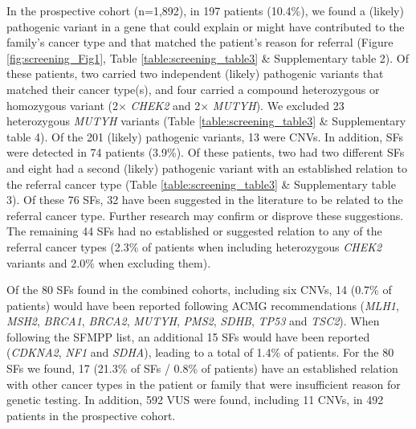 In the prospective cohort (n=1,892), in 197 patients (10.4\%), we found a (likely) pathogenic variant in a gene that could explain or might have contributed to the family’s cancer type and that matched the patient’s reason for referral (Figure \ref{fig:screening_Fig1}, Table \ref{table:screening_table3} \& Supplementary table 2). %
Of these patients, two carried two independent (likely) pathogenic variants that matched their cancer type(s), and four carried a compound heterozygous or homozygous variant (2$\times$  \textsl{CHEK2} and 2$\times$  \textsl{MUTYH}). 
We excluded 23 heterozygous \textsl{MUTYH} variants (Table \ref{table:screening_table3} \& Supplementary table 4). %
Of the 201 (likely) pathogenic variants, 13 were CNVs. In addition, SFs were detected in 74 patients (3.9\%). 
Of these patients, two had two different SFs and eight had a second (likely) pathogenic variant with an established relation to the referral cancer type (Table \ref{table:screening_table3} \& Supplementary table 3). 
Of these 76 SFs, 32 have been suggested in the literature to be related to the referral cancer type. 
Further research may confirm or disprove these suggestions. The remaining 44 SFs had no established or suggested relation to any of the referral cancer types (2.3\% of patients when including heterozygous \textsl{CHEK2} variants and 2.0\% when excluding them). 

Of the 80 SFs found in the combined cohorts, including six CNVs, 14 (0.7\% of patients) would have been reported following ACMG recommendations (\textsl{MLH1}, \textsl{MSH2}, \textsl{BRCA1}, \textsl{BRCA2}, \textsl{MUTYH}, \textsl{PMS2}, \textsl{SDHB}, \textsl{TP53} and \textsl{TSC2}). 
When following the SFMPP list, an additional 15 SFs would have been reported (\textsl{CDKNA2}, \textsl{NF1} and \textsl{SDHA}), leading to a total of 1.4\% of patients. 
For the 80 SFs we found, 17 (21.3\% of SFs / 0.8\% of patients) have an established relation with other cancer types in the patient or family that were insufficient reason for genetic testing. 
In addition, 592 VUS were found, including 11 CNVs, in 492 patients in the prospective cohort.


